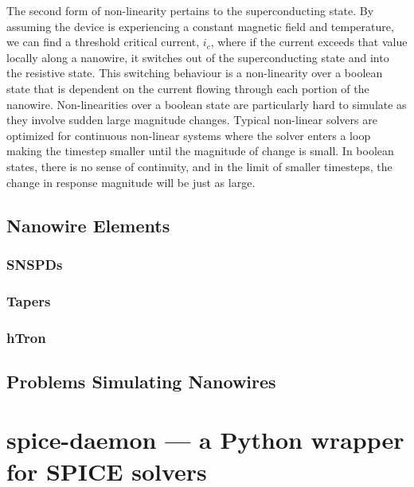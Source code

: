 \documentclass{article}
\begin{document}
The second form of non-linearity pertains to the superconducting state. By assuming the device is
experiencing a constant magnetic field and temperature, we can find a threshold critical current,
$i_c$, where if the current exceeds that value locally along a nanowire, it switches out of the 
superconducting state and into the resistive state. This switching behaviour is a non-linearity
over a boolean state that is dependent on the current flowing through each portion of the nanowire.
Non-linearities over a boolean state are particularly hard to simulate as they involve sudden large
magnitude changes. Typical non-linear solvers are optimized for continuous non-linear systems where
the solver enters a loop making the timestep smaller until the magnitude of change is small.
In boolean states, there is no sense of continuity, and in the limit of smaller timesteps, the 
change in response magnitude will be just as large. 

\subsection{Nanowire Elements}

\subsubsection{SNSPDs}


\subsubsection{Tapers}

\subsubsection{hTron}

\subsection{Problems Simulating Nanowires}

\section{spice-daemon --- a Python wrapper for SPICE solvers}
\end{document}
